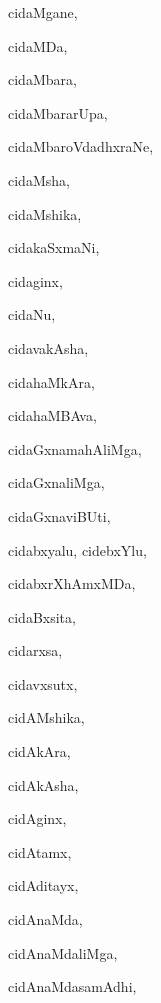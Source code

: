 \begin{multicols}{3}
{\noindent
{cidaMgane}, \pageref{cidaMgane}

\noindent
{cidaMDa}, \pageref{cidaMDa}

\noindent
{cidaMbara}, \pageref{cidaMbara}

\noindent
{cidaMbararUpa}, \pageref{cidaMbararUpa}

\noindent
{cidaMbaroVdadhxraNe}, \pageref{cidaMbaroVdadhxraNe}

\noindent
{cidaMsha}, \pageref{cidaMsha}

\noindent
{cidaMshika}, \pageref{cidaMshika}

\noindent
{cidakaSxmaNi}, \pageref{cidakaSxmaNi}

\noindent
{cidaginx}, \pageref{cidaginx}

\noindent
{cidaNu}, \pageref{cidaNu}

\noindent
{cidavakAsha}, \pageref{cidavakAsha}

\noindent
{cidahaMkAra}, \pageref{cidahaMkAra}

\noindent
{cidahaMBAva}, \pageref{cidahaMBAva}

\noindent
{cidaGxnamahAliMga}, \pageref{cidaGxnamahAliMga}

\noindent
{cidaGxnaliMga}, \pageref{cidaGxnaliMga}

\noindent
{cidaGxnaviBUti}, \pageref{cidaGxnaviBUti}

\noindent
{cidabxyalu, cidebxYlu}, \pageref{cidabxyalu, cidebxYlu}

\noindent
{cidabxrXhAmxMDa}, \pageref{cidabxrXhAmxMDa}

\noindent
{cidaBxsita}, \pageref{cidaBxsita}

\noindent
{cidarxsa}, \pageref{cidarxsa}

\noindent
{cidavxsutx}, \pageref{cidavxsutx}

\noindent
{cidAMshika}, \pageref{cidAMshika}

\noindent
{cidAkAra}, \pageref{cidAkAra}

\noindent
{cidAkAsha}, \pageref{cidAkAsha}

\noindent
{cidAginx}, \pageref{cidAginx}

\noindent
{cidAtamx}, \pageref{cidAtamx}

\noindent
{cidAditayx}, \pageref{cidAditayx}

\noindent
{cidAnaMda}, \pageref{cidAnaMda}

\noindent
{cidAnaMdaliMga}, \pageref{cidAnaMdaliMga}

\noindent
{cidAnaMdasamAdhi}, \pageref{cidAnaMdasamAdhi}

}
\end{multicols}
